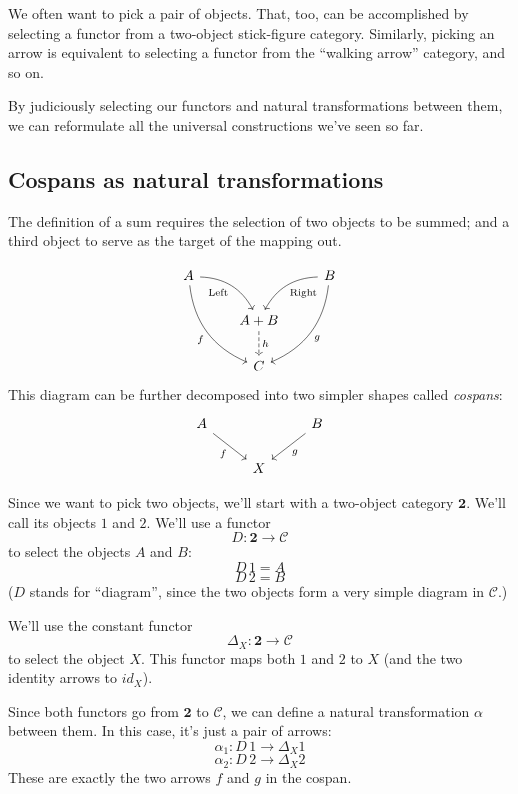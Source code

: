 \documentclass[DaoFP]{subfiles}
\begin{document}
We often want to pick a pair of objects. That, too, can be accomplished by selecting a functor from a two-object stick-figure category. Similarly, picking an arrow is equivalent to selecting a functor from the ``walking arrow'' category, and so on.

By judiciously selecting our functors and natural transformations between them, we can reformulate all the universal constructions we've seen so far.

\subsection{Cospans as natural transformations}

The definition of a sum requires the selection of two objects to be summed; and a third object to serve as the target of the mapping out.

\[
 \begin{tikzcd}
 A
 \arrow[dr,  bend left, "\text{Left}"']
 \arrow[ddr, bend right, "f"']
 && B
 \arrow[dl, bend right, "\text{Right}"]
 \arrow[ddl, bend left, "g"]
 \\
&A + B
\arrow[d, dashed, "h"]
\\
& C
 \end{tikzcd}
\]
This diagram can be further decomposed into two simpler shapes called \emph{cospans}:
\[
 \begin{tikzcd}
 A
 \arrow[dr, "f"']
 && B
 \arrow[dl, "g"]
 \\
 & X
 \end{tikzcd}
\]

Since we want to pick two objects, we'll start with a two-object category $\mathbf{2}$. We'll call its objects $1$ and $2$. 
We'll use a functor 
\[ D \colon \mathbf{2} \to \mathcal{C}\]
to select the objects $A$ and $B$: 
\[D\, 1 = A\]
\[ D\, 2 = B \]
($D$ stands for ``diagram'', since the two objects form a very simple diagram in $\mathcal{C}$.)

We'll use the constant functor 
\[ \Delta_X \colon \mathbf{2} \to \mathcal{C} \]
to select the object $X$. This functor maps both $1$ and $2$ to $X$ (and the two identity arrows to $id_X$).

Since both functors go from $\mathbf{2}$ to $\mathcal{C}$, we can define a natural transformation $\alpha$ between them. In this case, it's just a pair of arrows:
\[ \alpha_1 \colon D \, 1 \to \Delta_X 1 \]
\[ \alpha_2 \colon D \, 2 \to \Delta_X 2 \]
These are exactly the two arrows $f$ and $g$ in the cospan. 
\end{document}
